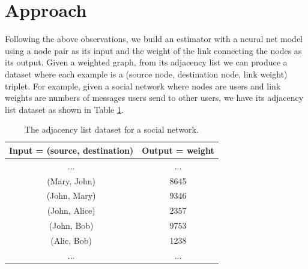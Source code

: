 \documentclass[11pt,twocolumn]{article}
\begin{document}
\section{Approach}
Following the above observations,
we build an estimator with a neural net model using a node pair as its input
and the weight of the link connecting the nodes as its output.
Given a weighted graph, from its adjacency list we can produce a dataset where each example is a (source node, destination node, link weight) triplet.
For example, given a social network where nodes are users and link weights are numbers of messages users send to other users, we have its adjacency list dataset as shown in Table \ref{tab:link-list-dataset}.
\begin{table}[!ht]
	\centering
	\caption{The adjacency list dataset for a social network.}
	\begin{tabular}{cc}  \hline \rowcolor{blue!30}
		Input = (source, destination) & Output = weight \\ \hline
		...                        & ... \\ \hline
		(Mary, John) & 8645 \\ \hline
		(John, Mary) & 9346 \\ \hline
		(John, Alice) & 2357 \\ \hline
		(John, Bob) & 9753 \\ \hline
		(Alic, Bob) & 1238 \\ \hline
		...                        & ... \\ \hline
	\end{tabular}
	\label{tab:link-list-dataset}
\end{table}
\end{document}
